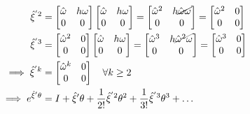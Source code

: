 \begin{align*}
      \hat{\xi}^{'2}
       & =
      \begin{bmatrix}
            \hat \omega & h \omega \\
            0           & 0
      \end{bmatrix}
      \begin{bmatrix}
            \hat \omega & h \omega \\
            0           & 0
      \end{bmatrix}
      =
      \begin{bmatrix}
            \hat{\omega}^2 & h \cancel{\hat{\omega} \omega} \\
            0              & 0
      \end{bmatrix}
      =
      \begin{bmatrix}
            \hat{\omega}^2 & 0 \\
            0              & 0
      \end{bmatrix}
      \\
      \hat{\xi}^{'3}
       & =
      \begin{bmatrix}
            \hat{\omega}^2 & 0 \\
            0              & 0
      \end{bmatrix}
      \begin{bmatrix}
            \hat \omega & h \omega \\
            0           & 0
      \end{bmatrix}
      =
      \begin{bmatrix}
            \hat{\omega}^3 & h \cancel{\hat{\omega}^2 \omega} \\
            0              & 0
      \end{bmatrix}
      =
      \begin{bmatrix}
            \hat{\omega}^3 & 0 \\
            0              & 0
      \end{bmatrix}
      \\
      \implies
      \hat{\xi}^{'k}
       & =
      \begin{bmatrix}
            \hat{\omega}^k & 0 \\
            0              & 0
      \end{bmatrix}
      \quad \forall k \geq 2
      \\
      \implies
      e^{\hat{\xi}' \theta}
       & =
      I + \hat{\xi}' \theta + \frac{1}{2!} \hat{\xi}^{'2} \theta^2 + \frac{1}{3!} \hat{\xi}^{'3} \theta^3 + \ldots

\end{align*}
